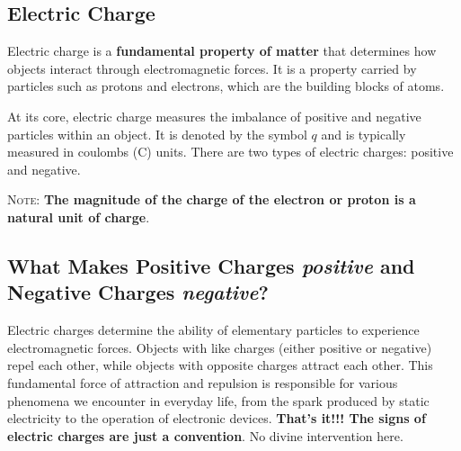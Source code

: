 \documentclass[12pt,b4paper]{article}
\begin{document}
\subsection{Electric Charge}
Electric charge is a \textbf{fundamental property of matter} that determines how objects interact through electromagnetic forces. It is a property carried by particles such as protons and electrons, which are the building blocks of atoms.

At its core, electric charge measures the imbalance of positive and negative particles within an object. It is denoted by the symbol $q$ and is typically measured in coulombs (C) units. There are two types of electric charges: positive and negative.

\textsc{Note}: \textbf{The magnitude of the charge of the electron or proton is a natural unit of charge}.
\subsection*{What Makes Positive Charges \textit{positive} and Negative Charges \textit{negative}?}
Electric charges determine the ability of elementary particles to experience electromagnetic forces. Objects with like charges (either positive or negative) repel each other, while objects with opposite charges attract each other. This fundamental force of attraction and repulsion is responsible for various phenomena we encounter in everyday life, from the spark produced by static electricity to the operation of electronic devices. \textbf{That's it!!! The signs of electric charges are just a convention}. No divine intervention here.
\end{document}
